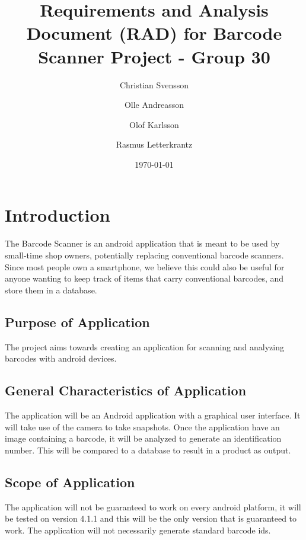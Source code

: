 \documentclass{report}
\begin{document}
\title{Requirements and Analysis Document (RAD) for Barcode Scanner Project - Group 30}
\author{
    Christian Svensson\\
    \and
    Olle Andreasson\\
    \and
    Olof Karlsson\\
    \and
    Rasmus Letterkrantz
}
\date{\today}
\maketitle

\tableofcontents

\chapter{Introduction}

The Barcode Scanner is an android application that is meant to be used by small-time shop owners, potentially replacing conventional barcode scanners. Since most people own a smartphone, we believe this could also be useful for anyone wanting to keep track of items that carry conventional barcodes, and store them in a database.

\section{Purpose of Application}
The project aims towards creating an application for scanning and analyzing barcodes with android devices.

\section{General Characteristics of Application}
The application will be an Android application with a graphical user interface. It will take use of the camera to take snapshots. Once the application have an image containing a barcode, it will be analyzed to generate an identification number. This will be compared to a database to result in a product as output.\cite{website:barcodescanner}

\section{Scope of Application}
The application will not be guaranteed to work on every android platform, it will be tested on version 4.1.1 and this will be the only version that is guaranteed to work. The application will not necessarily generate standard barcode ids.
\end{document}
